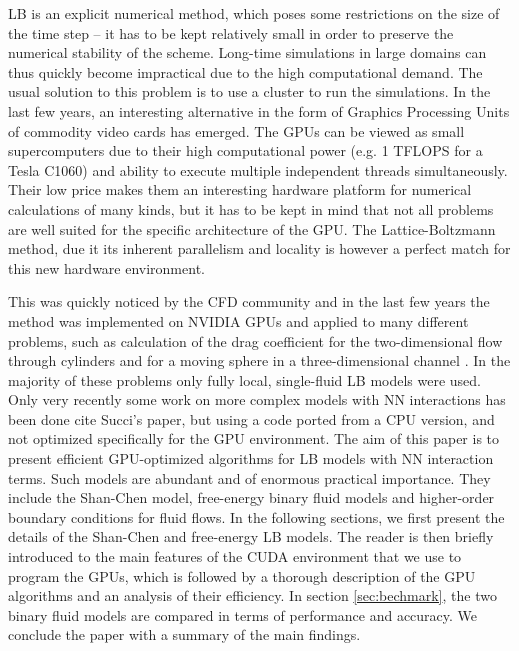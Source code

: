 \documentclass[mathpazo,sort,numbers]{cicp}
\begin{document}
LB is an explicit numerical method, which poses some restrictions on the size of the time step --
it has to be kept relatively small in order to preserve the numerical stability of the scheme.  Long-time
simulations in large domains can thus quickly become impractical due to the high computational demand.
The usual solution to this problem is to use a cluster to run the simulations.  In the last few
years, an interesting alternative in the form of Graphics Processing Units of commodity video
cards has emerged.  The GPUs can be viewed as small supercomputers due to their high
computational power (e.g. 1 TFLOPS for a Tesla C1060) and ability to execute multiple
independent threads simultaneously.  Their low price makes them an interesting hardware
platform for numerical calculations of many kinds, but it has to be kept in mind that not
all problems are well suited for the specific architecture of the GPU.  The Lattice-Boltzmann
method, due it its inherent parallelism and locality is however a perfect match for this
new hardware environment.

This was quickly noticed by the CFD community and in the last few years the method was
implemented on NVIDIA GPUs and applied to many different problems, such as calculation of
the drag coefficient for the two-dimensional flow through cylinders \cite{tolke-twod} and
for a moving sphere in a three-dimensional channel \cite{tolke-GPU}.  In the majority of these
problems only fully local, single-fluid LB models were used.  Only very recently some
work on more complex models with NN interactions has been done {\color{red} cite Succi's paper},
but using a code ported from a CPU version, and not optimized specifically for the GPU
environment.
The aim of this paper is to present efficient GPU-optimized algorithms for LB models
with NN interaction terms.  Such models are abundant and of enormous practical importance.
They include the Shan-Chen model, free-energy binary fluid models and higher-order
boundary conditions for fluid flows.  In the following sections, we first present
the details of the Shan-Chen and free-energy LB models.  The reader
is then briefly introduced to the main features of the CUDA environment
that we use to program the GPUs, which is followed by a thorough description
of the GPU algorithms and an analysis of their efficiency.  In section \ref{sec:bechmark}, the two
binary fluid models are compared in terms of performance and accuracy.
We conclude the paper with a summary of the main findings.
\end{document}
